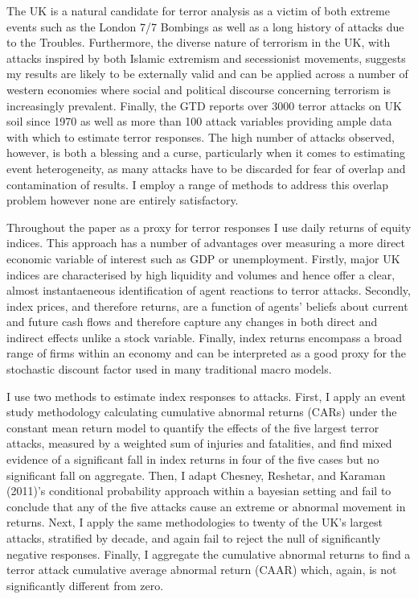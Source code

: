\documentclass[]{AEA}
\begin{document}
The UK is a natural candidate for terror analysis as a victim of both
extreme events such as the London 7/7 Bombings as well as a long history
of attacks due to the Troubles. Furthermore, the diverse nature of
terrorism in the UK, with attacks inspired by both Islamic extremism and
secessionist movements, suggests my results are likely to be externally
valid and can be applied across a number of western economies where
social and political discourse concerning terrorism is increasingly
prevalent. Finally, the GTD reports over 3000 terror attacks on UK soil
since 1970 as well as more than 100 attack variables providing ample
data with which to estimate terror responses. The high number of attacks
observed, however, is both a blessing and a curse, particularly when it
comes to estimating event heterogeneity, as many attacks have to be
discarded for fear of overlap and contamination of results. I employ a
range of methods to address this overlap problem however none are
entirely satisfactory.

Throughout the paper as a proxy for terror responses I use daily returns
of equity indices. This approach has a number of advantages over
measuring a more direct economic variable of interest such as GDP or
unemployment. Firstly, major UK indices are characterised by high
liquidity and volumes and hence offer a clear, almost instantaeneous
identification of agent reactions to terror attacks. Secondly, index
prices, and therefore returns, are a function of agents' beliefs about
current and future cash flows and therefore capture any changes in both
direct and indirect effects unlike a stock variable. Finally, index
returns encompass a broad range of firms within an economy and can be
interpreted as a good proxy for the stochastic discount factor used in
many traditional macro models.

I use two methods to estimate index responses to attacks. First, I apply
an event study methodology calculating cumulative abnormal returns
(CARs) under the constant mean return model to quantify the effects of
the five largest terror attacks, measured by a weighted sum of injuries
and fatalities, and find mixed evidence of a significant fall in index
returns in four of the five cases but no significant fall on aggregate.
Then, I adapt Chesney, Reshetar, and Karaman (2011)'s conditional
probability approach within a bayesian setting and fail to conclude that
any of the five attacks cause an extreme or abnormal movement in
returns. Next, I apply the same methodologies to twenty of the UK's
largest attacks, stratified by decade, and again fail to reject the null
of significantly negative responses. Finally, I aggregate the cumulative
abnormal returns to find a terror attack cumulative average abnormal
return (CAAR) which, again, is not significantly different from zero.
\end{document}
